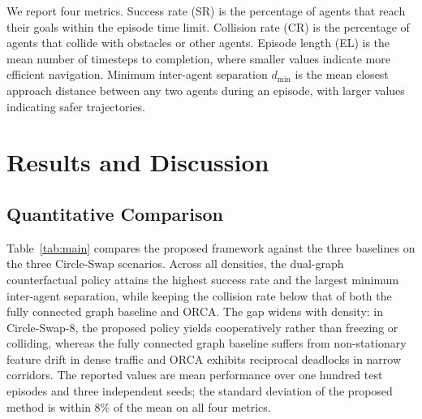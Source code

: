 \documentclass[journal,twoside,web]{ieeecolor}
\begin{document}
We report four metrics. Success rate (SR) is the percentage of agents that reach their goals within the episode time limit. Collision rate (CR) is the percentage of agents that collide with obstacles or other agents. Episode length (EL) is the mean number of timesteps to completion, where smaller values indicate more efficient navigation. Minimum inter-agent separation $d_{\min}$ is the mean closest approach distance between any two agents during an episode, with larger values indicating safer trajectories.

\section{Results and Discussion}
\label{sec:results}

\subsection{Quantitative Comparison}

Table~\ref{tab:main} compares the proposed framework against the three baselines on the three Circle-Swap scenarios. Across all densities, the dual-graph counterfactual policy attains the highest success rate and the largest minimum inter-agent separation, while keeping the collision rate below that of both the fully connected graph baseline and ORCA. The gap widens with density: in Circle-Swap-$8$, the proposed policy yields cooperatively rather than freezing or colliding, whereas the fully connected graph baseline suffers from non-stationary feature drift in dense traffic and ORCA exhibits reciprocal deadlocks in narrow corridors. The reported values are mean performance over one hundred test episodes and three independent seeds; the standard deviation of the proposed method is within 8\% of the mean on all four metrics.
\end{document}
